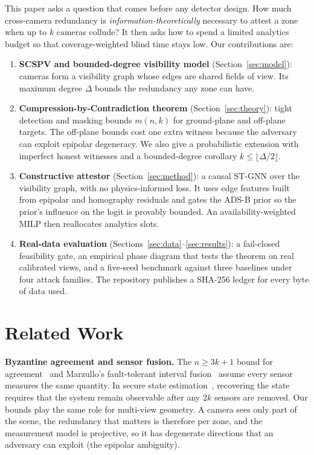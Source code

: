 \documentclass[journal]{IEEEtran}
\theoremstyle{remark}
\begin{document}
This paper asks a question that comes before any detector design. How much cross-camera redundancy is
\emph{information-theoretically} necessary to attest a zone when up to $k$ cameras collude? It then asks how to spend a
limited analytics budget so that coverage-weighted blind time stays low. Our contributions are:
\begin{enumerate}
\item \textbf{SCSPV and bounded-degree visibility model} (Section~\ref{sec:model}): cameras form a visibility graph
whose edges are shared fields of view. Its maximum degree $\Delta$ bounds the redundancy any zone can have.
\item \textbf{Compression-by-Contradiction theorem} (Section~\ref{sec:theory}): tight detection and masking bounds
$m(n,k)$ for ground-plane and off-plane targets. The off-plane bounds cost one extra witness because the adversary can
exploit epipolar degeneracy. We also give a probabilistic extension with imperfect honest witnesses and a
bounded-degree corollary $k\le\lfloor\Delta/2\rfloor$.
\item \textbf{Constructive attestor} (Section~\ref{sec:method}): a causal ST-GNN over the visibility graph, with no
physics-informed loss. It uses edge features built from epipolar and homography residuals and gates the ADS-B prior so
the prior's influence on the logit is provably bounded. An availability-weighted MILP then reallocates analytics slots.
\item \textbf{Real-data evaluation} (Sections~\ref{sec:data}--\ref{sec:results}): a fail-closed feasibility gate, an
empirical phase diagram that tests the theorem on real calibrated views, and a five-seed benchmark against three
baselines under four attack families. The repository publishes a SHA-256 ledger for every byte of data used.
\end{enumerate}

\section{Related Work}
\textbf{Byzantine agreement and sensor fusion.} The $n\ge 3k{+}1$ bound for agreement~\cite{pease1980reaching,lamport1982byzantine}
and Marzullo's fault-tolerant interval fusion~\cite{marzullo1990tolerating} assume every sensor measures the same
quantity. In secure state estimation~\cite{fawzi2014secure}, recovering the state requires that the system remain
observable after any $2k$ sensors are removed. Our bounds play the same role for multi-view geometry. A camera sees only
part of the scene, the redundancy that matters is therefore per zone, and the measurement model is projective, so it
has degenerate directions that an adversary can exploit (the epipolar ambiguity).
\end{document}
